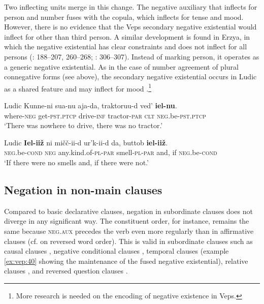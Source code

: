\documentclass[output=paper,colorlinks=true, citecolor=brown]{langscibook}
\begin{document}
Two inflecting units merge in this change. The negative auxiliary that inflects for person and number fuses with the copula, which inflects for tense and mood. However, there is no evidence that the Veps secondary negative existential would inflect for other than third person.  A similar development is found in Erzya, in which the negative existential has clear constraints and does not inflect for all persons (\citealt{Hamari2007}: 188–207, 260–268; \citealt{HamariAasmäe2015}: 306–307). Instead of marking person, it operates as a generic negative existential. As in the case of number agreement of plural connegative forms (see  above), the secondary negative existential occurs in Ludic as a shared feature  and may inflect for mood .\footnote{More research is needed on the encoding of negative existence in Veps.}

\ea\label{ex:vep:36} Ludic \newline %
    \gll Kunne{}-ni sua-nu aja-da, traktoruu-d ved’ \textbf{iel{}-nu}. \\
         where{}-\textsc{neg} get-\textsc{pst.ptcp} drive\textsc{{}-inf} tractor-\textsc{par} \textsc{clt} \textsc{neg}.be-\textsc{pst.ptcp} \\
    \glt ‘There was nowhere to drive, there was no tractor.’ \citep[110]{Pahomov2011}
\z


\ea\label{ex:vep:37} Ludic \newline %
    \gll \textbf{Iel-iiž} ni mičč{}-ii{}-d  ur’k-ii-d da, buttob \textbf{iel{}-iiž}. \\
         \textsc{neg}.be\textsc{{}-cond} \textsc{neg} any.kind.of{}-\textsc{pl}{}-\textsc{par} smell{}-\textsc{pl}{}-\textsc{par} and, if \textsc{neg}.be\textsc{{}-cond}\\
    \glt ‘If there were no smells and, if there were not.’ \citep[206]{Pahomov2011}
\z 

\subsection{Negation in non-main clauses}\label{sec:vep:2.4}

Compared to basic declarative clauses, negation in subordinate clauses does not diverge in any significant way. The constituent order, for instance, remains the same because \textsc{neg}.\textsc{aux} precedes the verb even more regularly than in affirmative clauses (cf.  on reversed word order). This is valid in subordinate clauses such as causal clauses , negative conditional clauses , temporal clauses (example \ref{ex:vep:40} showing the maintenance of the fused negative existential), relative clauses , and reversed question clauses .
\end{document}

